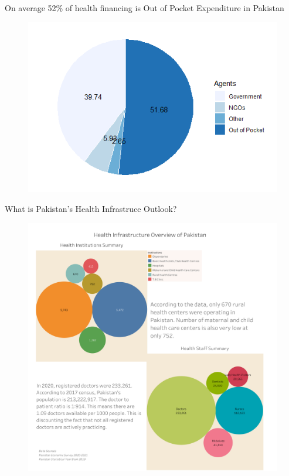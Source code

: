 \documentclass[
  ignorenonframetext,
]{beamer}
\begin{document}
\begin{frame}{On average 52\% of health financing is Out of Pocket
Expenditure in Pakistan}
\protect\hypertarget{on-average-52-of-health-financing-is-out-of-pocket-expenditure-in-pakistan}{}
\begin{figure}

{\centering \includegraphics{health-financing.png}

}

\end{figure}
\end{frame}

\begin{frame}{What is Pakistan's Health Infrastruce Outlook?}
\protect\hypertarget{what-is-pakistans-health-infrastruce-outlook}{}
\begin{figure}

{\centering \includegraphics{health-infrastructure.png}

}

\end{figure}
\end{frame}
\end{document}
